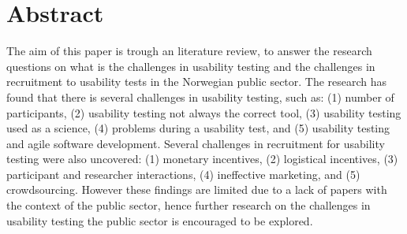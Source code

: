 \section*{Abstract}
The aim of this paper is trough an literature review, to answer the research questions on what is the challenges in usability testing and the challenges in recruitment to usability tests in the Norwegian public sector. The research has found that there is several challenges in usability testing, such as: (1) number of participants, (2) usability testing not always the correct tool, (3) usability testing used as a science, (4) problems during a usability test, and (5) usability testing and agile software development. Several challenges in recruitment for usability testing were also uncovered: (1) monetary incentives, (2) logistical incentives, (3) participant and researcher interactions, (4) ineffective marketing, and (5) crowdsourcing. However these findings are limited due to a lack of papers with the context of the public sector, hence further research on the challenges in usability testing the public sector is encouraged to be explored.

\newpage